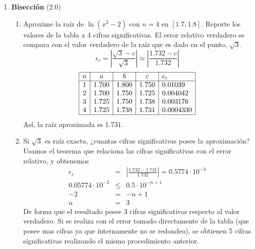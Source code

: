 \documentclass[12pt]{article}
\begin{document}
\begin{enumerate}[leftmargin=*,widest=9]
\begin{enumerate}[label=\alph*]
    \end{enumerate}
    \item \textbf{Bisección} ($2.0$)
    \begin{enumerate}[label=\alph*]
    \item Aproxime la raíz de $\ln (x^2 - 2)$ con $n=4$ en $\left[1.7, 1.8\right]$. Reporte los valores de la tabla a 4 cifras significativas.
    El error relativo verdadero se compara con el valor verdadero de la raíz que es dado en el punto, $\sqrt{3}$.
    \[ \epsilon_r = \left| \frac{\sqrt{3} - c}{\sqrt{3}} \right| \approx \left|\frac{1.732 - c}{1.732} \right| \]
    \[
    \begin{array}{|c|c|c|c|l|}
    \hline
    n & a & b & c & \epsilon_r \\
    \hline
    1  & 1.700  & 1.800 & 1.750  & 0.01039\\
    2 &  1.700 & 1.750 & 1.725 & 0.004042\\
    3 & 1.725 & 1.750 & 1.738 & 0.003176\\
    4 & 1.725 & 1.738 & 1.731 & 0.0004330 \\
    \hline
    \end{array}
    \]
    Así, la raíz aproximada es $1.731$.
    \item Si $\sqrt{3}$ es raíz exacta, ¿cuantas cifras significativas posee la aproximación?
    Usamos el teorema que relaciona las cifras significativas con el error relativo, y obtenemos
    \begin{eqnarray*}
    \epsilon_r  & = & \left| \frac{1.732 - 1.731}{1.732} \right| = 0.5774\cdot 10^{-3}  \\
    0.05774\cdot 10^{-2} & \leq & 0.5 \cdot 10^{-n + 1} \\
    -2 & = & -n + 1 \\
    n & = & 3
    \end{eqnarray*}
    De forma que el resultado posee 3 cifras significativas respecto al valor verdadero. Si se realiza con el error tomado directamente de la tabla (que posee mas cifras ya que internamente no se redondeo), se obtienen 5 cifras significativas realizando el mismo procedimiento anterior.
    \end{enumerate}
  \end{enumerate}
\end{document}
